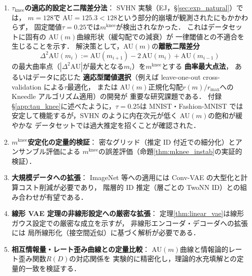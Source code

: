 \documentclass[11pt,a4paper]{jsarticle}
\newcommand{\mknee}{m^{\mathrm{knee}}}
\begin{document}
\begin{enumerate}
  \item \textbf{$\tau_{\mathrm{knee}}$の適応的設定と二階差分法}：
        SVHN 実験（EJ，§\ref{sec:exp_natural}）では，
        $m = 128$で AU$= 125.3 < 128$という部分的崩壊が観測されたにもかかわらず，
        固定閾値$\tau = 0.25$では$\mknee$が検出されなかった．
        これはデータセットに固有の AU$(m)$曲線形状（緩勾配での減衰）が
        一律閾値との不適合を生じることを示す．
        解決策として，AU$(m)$の\textbf{離散二階差分}
        \begin{equation}
          \Delta^2\mathrm{AU}(m_i) := \mathrm{AU}(m_{i+1}) - 2\,\mathrm{AU}(m_i) + \mathrm{AU}(m_{i-1})
          \label{eq:second_diff}
        \end{equation}
        の最大曲率点（$|\Delta^2\mathrm{AU}|$が最大となる$m_i$）を$\mknee$とする
        \textbf{曲率最大点法}，
        あるいはデータに応じた
        \textbf{適応型閾値選択}（例えば leave-one-out cross-validation による$\tau$最適化，
        または AU$(m)$正規化勾配$r(m)/r_{\max}$への Kneedle アルゴリズム適用）の開発が
        重要な研究課題である．
        付録§\ref{app:tau_knee}に述べたように，$\tau = 0.25$は MNIST・Fashion-MNIST では
        安定して機能するが，SVHN のように内在次元が低く AU$(m)$の飽和が緩やかな
        データセットでは過大推定を招くことが確認された．
  \item \textbf{$\mknee$安定化の定量的検証}：
        密なグリッド（推定 ID 付近での細分化）とアンサンブル評価による
        $\mknee$の誤差評価（命題\ref{thm:mknee_instab}の実証的検証）．
  \item \textbf{大規模データへの拡張}：
        ImageNet 等への適用には Conv-VAE の大型化と計算コスト削減が必要であり，
        階層的 ID 推定（層ごとの TwoNN ID）との組み合わせが有望である．
  \item \textbf{線形 VAE 定理の非線形設定への厳密な拡張}：
        定理\ref{thm:linear_vae}は線形ガウス設定での厳密な成立を示すが，
        非線形エンコーダ・デコーダへの拡張には
        局所線形化（接空間近似）に基づく解析が必要である．
  \item \textbf{相互情報量・レート歪み曲線との定量比較}：
        AU$(m)$曲線と情報論的レート歪み関数$R(D)$の対応関係を
        実験的に精密化し，理論的水充填解との定量的一致を検証する．
\end{enumerate}
\end{document}
